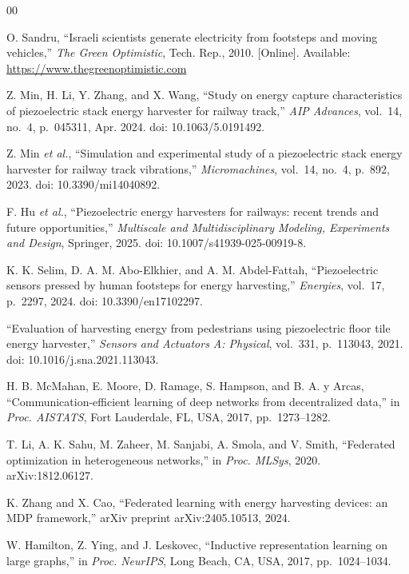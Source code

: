 \documentclass[conference]{IEEEtran}
\begin{document}
\begin{thebibliography}{00}

O. Sandru, ``Israeli scientists generate electricity from footsteps and moving vehicles,'' \textit{The Green Optimistic}, Tech. Rep., 2010. [Online]. Available: \url{https://www.thegreenoptimistic.com}

Z. Min, H. Li, Y. Zhang, and X. Wang, ``Study on energy capture characteristics of piezoelectric stack energy harvester for railway track,'' \textit{AIP Advances}, vol.~14, no.~4, p.~045311, Apr. 2024. doi: 10.1063/5.0191492.

Z. Min \textit{et al.}, ``Simulation and experimental study of a piezoelectric stack energy harvester for railway track vibrations,'' \textit{Micromachines}, vol.~14, no.~4, p.~892, 2023. doi: 10.3390/mi14040892.

F. Hu \textit{et al.}, ``Piezoelectric energy harvesters for railways: recent trends and future opportunities,'' \textit{Multiscale and Multidisciplinary Modeling, Experiments and Design}, Springer, 2025. doi: 10.1007/s41939-025-00919-8.

K. K. Selim, D. A. M. Abo-Elkhier, and A. M. Abdel-Fattah, ``Piezoelectric sensors pressed by human footsteps for energy harvesting,'' \textit{Energies}, vol.~17, p.~2297, 2024. doi: 10.3390/en17102297.

``Evaluation of harvesting energy from pedestrians using piezoelectric floor tile energy harvester,'' \textit{Sensors and Actuators A: Physical}, vol.~331, p.~113043, 2021. doi: 10.1016/j.sna.2021.113043.

H. B. McMahan, E. Moore, D. Ramage, S. Hampson, and B. A. y Arcas, ``Communication-efficient learning of deep networks from decentralized data,'' in \textit{Proc. AISTATS}, Fort Lauderdale, FL, USA, 2017, pp.~1273--1282.

T. Li, A. K. Sahu, M. Zaheer, M. Sanjabi, A. Smola, and V. Smith, ``Federated optimization in heterogeneous networks,'' in \textit{Proc. MLSys}, 2020. arXiv:1812.06127.

K. Zhang and X. Cao, ``Federated learning with energy harvesting devices: an MDP framework,'' arXiv preprint arXiv:2405.10513, 2024.

W. Hamilton, Z. Ying, and J. Leskovec, ``Inductive representation learning on large graphs,'' in \textit{Proc. NeurIPS}, Long Beach, CA, USA, 2017, pp.~1024--1034.


\end{thebibliography}
\end{document}
